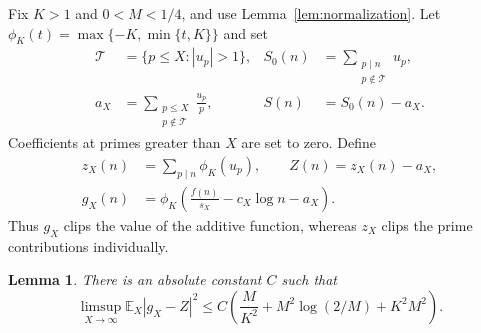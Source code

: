 \documentclass[11pt]{article}
\numberwithin{equation}{section}
\newtheorem{lemma}[theorem]{Lemma}
\newcommand{\E}{\mathbb E}
\newcommand{\clip}{\phi_K}
\begin{document}
Fix $K>1$ and $0<M<1/4$, and use Lemma~\ref{lem:normalization}.
Let $\clip(t)=\max\{-K,\min\{t,K\}\}$ and set
\begin{align*}
 \mathcal T&=\{p\le X:|u_p|>1\},&
 S_0(n)&=\sum_{\substack{p\mid n\\p\notin\mathcal T}}u_p,\\
 a_X&=\sum_{\substack{p\le X\\p\notin\mathcal T}}\frac{u_p}{p},&
 S(n)&=S_0(n)-a_X.
\end{align*}
Coefficients at primes greater than $X$ are set to zero. Define
\begin{equation}\label{eq:clipped-and-Z}
 \begin{split}
 z_X(n)&=\sum_{p\mid n}\clip(u_p),\qquad Z(n)=z_X(n)-a_X,\\
 g_X(n)&=\clip\left(\frac{f(n)}{s_X}-c_X\log n-a_X\right).
 \end{split}
\end{equation}
Thus $g_X$ clips the value of the additive function, whereas $z_X$
clips the prime contributions individually.

\begin{lemma}\label{lem:clipping}
There is an absolute constant $C$ such that
\begin{equation}\label{eq:clipping-bound}
 \limsup_{X\to\infty}\E_X|g_X-Z|^2
 \le C\left(\frac M{K^2}+M^2\log(2/M)+K^2M^2\right).
\end{equation}
\end{lemma}
\end{document}
